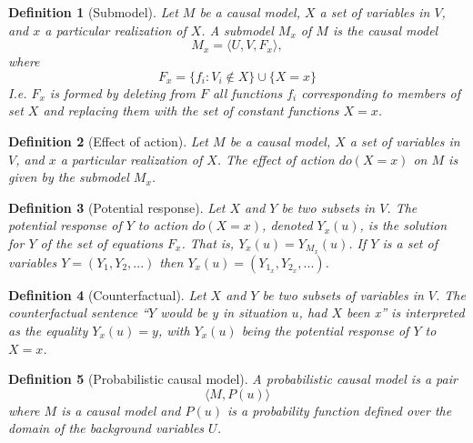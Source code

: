 \documentclass[11pt]{article}
\numberwithin{equation}{section}
\newtheorem{defn}{Definition}[section]
\begin{document}
\begin{defn}[Submodel]
Let $M$ be a causal model, $X$ a set of variables in $V$, and $x$ a particular realization of $X$. A submodel $M_x$ of $M$ is the causal model
\begin{equation}
M_x = \langle U, V, F_x \rangle, \nonumber
\end{equation}
where
\begin{equation}
F_x = \{f_i : V_i \notin X \} \cup \{X=x \}
\end{equation}
I.e. $F_x$ is formed by deleting from $F$ all functions $f_i$ corresponding to members of set $X$ and replacing them with the set of constant functions $X=x$.
\end{defn}

\begin{defn}[Effect of action]
Let $M$ be a causal model, $X$ a set of variables in $V$, and $x$ a particular realization of $X$. The effect of action $do(X=x)$ on $M$ is given by the submodel $M_x$.
\end{defn}

\begin{defn}[Potential response]
Let $X$ and $Y$ be two subsets in $V$. The potential response of $Y$ to action $do(X=x)$, denoted $Y_x(u)$, is the solution for $Y$ of the set of equations $F_x$. That is, $Y_x(u) = Y_{M_x}(u)$. If $Y$ is a set of variables $Y=(Y_1,Y_2,...)$ then $Y_x(u) = (Y_{1_x},Y_{2_x},...)$.
\end{defn}

\begin{defn}[Counterfactual]
Let $X$ and $Y$ be two subsets of variables in $V$. The counterfactual sentence ``$Y$ would be $y$ in situation $u$, had $X$ been x'' is interpreted as the equality $Y_x(u)=y$, with $Y_x(u)$ being the potential response of $Y$ to $X=x$.
\end{defn}

\begin{defn}[Probabilistic causal model]
A probabilistic causal model is a pair
\begin{equation}
\langle M, P(u)\rangle \nonumber
\end{equation}
where $M$ is a causal model and $P(u)$ is a probability function defined over the domain of the background variables $U$.
\end{defn}
\end{document}
